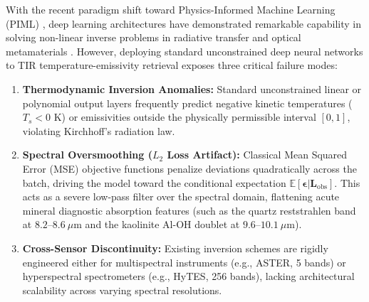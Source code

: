 \documentclass[journal]{IEEEtran}
\begin{document}
With the recent paradigm shift toward Physics-Informed Machine Learning (PIML) \cite{raissi2019physics, kashinath2021physics}, deep learning architectures have demonstrated remarkable capability in solving non-linear inverse problems in radiative transfer \cite{mishra2021physics} and optical metamaterials \cite{chen2020physics}. However, deploying standard unconstrained deep neural networks to TIR temperature-emissivity retrieval exposes three critical failure modes:
\begin{enumerate}
    \item \textbf{Thermodynamic Inversion Anomalies:} Standard unconstrained linear or polynomial output layers frequently predict negative kinetic temperatures ($T_s < 0\text{ K}$) or emissivities outside the physically permissible interval $[0, 1]$, violating Kirchhoff's radiation law.
    \item \textbf{Spectral Oversmoothing ($L_2$ Loss Artifact):} Classical Mean Squared Error (MSE) objective functions penalize deviations quadratically across the batch, driving the model toward the conditional expectation $\mathbb{E}[\bm{\epsilon}|\bm{L}_{\text{obs}}]$. This acts as a severe low-pass filter over the spectral domain, flattening acute mineral diagnostic absorption features (such as the quartz reststrahlen band at $8.2\text{--}8.6\ \mu\text{m}$ and the kaolinite Al-OH doublet at $9.6\text{--}10.1\ \mu\text{m}$).
    \item \textbf{Cross-Sensor Discontinuity:} Existing inversion schemes are rigidly engineered either for multispectral instruments (e.g., ASTER, 5 bands) or hyperspectral spectrometers (e.g., HyTES, 256 bands), lacking architectural scalability across varying spectral resolutions.
\end{enumerate}
\end{document}
